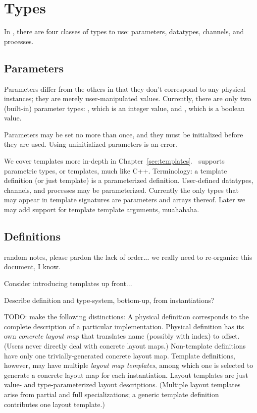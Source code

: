 

\chapter{Types}
\label{sec:types}

In \hac, there are four classes of types to use:
parameters, datatypes, channels, and processes.  

\section{Parameters}
\label{sec:parameters}

Parameters differ from the others in that they don't correspond
to any physical instances; they are merely user-manipulated values.  
Currently, there are only two (built-in) parameter types: 
\pint, which is an integer value,
and \pbool, which is a boolean value.  

Parameters may be set no more than once, and they must be 
initialized before they are used.  
Using uninitialized parameters is an error.  


We cover templates more in-depth in Chapter~\ref{sec:templates}.  
\hac\ supports parametric types, or templates, much like C++. 
Terminology: a template definition (or just template)
is a parameterized definition.  
User-defined datatypes, channels, and processes may be parameterized.  
Currently the only types that may appear in template signatures
are parameters and arrays thereof.  
Later we may add support for template template arguments, muahahaha.  

\section{Definitions}
\label{sec:types:definition}

random notes, please pardon the lack of order...
we really need to re-organize this document, I know.

Consider introducing templates up front...

Describe definition and type-system, bottom-up, from instantiations?

TODO: make the following distinctions:
A physical definition corresponds to the complete description of
a particular implementation.  
Physical definition has its own 
\emph{concrete layout map} 
that translates name (possibly with index) to offset.  
(Users never directly deal with concrete layout maps.)  
Non-template definitions have only one trivially-generated 
concrete layout map.  
Template definitions, however, may have multiple \emph{layout map templates}, 
among which one is selected to generate a concrete layout map for
each instantiation.  
Layout templates are just value- and type-parameterized layout descriptions.  
(Multiple layout templates arise from partial and full specializations; 
a generic template definition contributes one layout template.)


